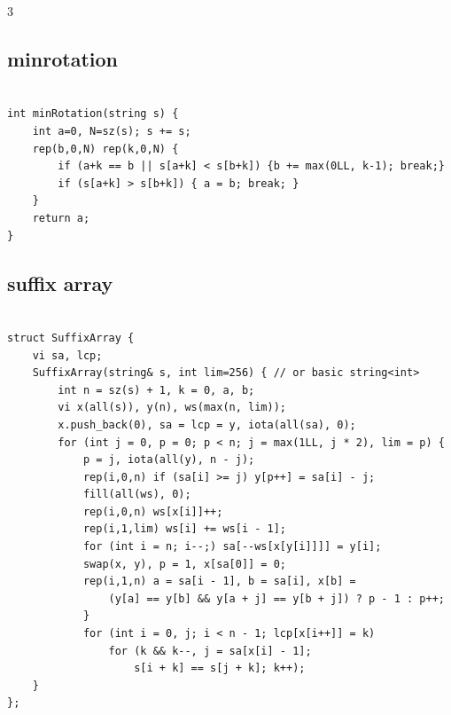 \documentclass[twoside]{article}
\begin{document}
\begin{multicols*}{3}
{\subsection*{minrotation}
}
\begin{verbatim}

int minRotation(string s) {
    int a=0, N=sz(s); s += s;
    rep(b,0,N) rep(k,0,N) {
        if (a+k == b || s[a+k] < s[b+k]) {b += max(0LL, k-1); break;}
        if (s[a+k] > s[b+k]) { a = b; break; }
    }
    return a;
}

\end{verbatim}

{
\subsection*{suffix array}
}
\begin{verbatim}

struct SuffixArray {
    vi sa, lcp;
    SuffixArray(string& s, int lim=256) { // or basic string<int>
        int n = sz(s) + 1, k = 0, a, b;
        vi x(all(s)), y(n), ws(max(n, lim));
        x.push_back(0), sa = lcp = y, iota(all(sa), 0);
        for (int j = 0, p = 0; p < n; j = max(1LL, j * 2), lim = p) {
            p = j, iota(all(y), n - j);
            rep(i,0,n) if (sa[i] >= j) y[p++] = sa[i] - j;
            fill(all(ws), 0);
            rep(i,0,n) ws[x[i]]++;
            rep(i,1,lim) ws[i] += ws[i - 1];
            for (int i = n; i--;) sa[--ws[x[y[i]]]] = y[i];
            swap(x, y), p = 1, x[sa[0]] = 0;
            rep(i,1,n) a = sa[i - 1], b = sa[i], x[b] =
                (y[a] == y[b] && y[a + j] == y[b + j]) ? p - 1 : p++;
            }
            for (int i = 0, j; i < n - 1; lcp[x[i++]] = k)
                for (k && k--, j = sa[x[i] - 1];
                    s[i + k] == s[j + k]; k++);
    }
};

\end{verbatim}

{
}
\end{multicols*}
\end{document}
